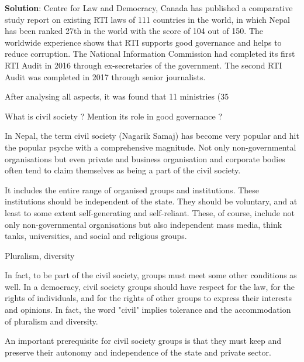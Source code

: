 \documentclass[
]{book}
\newcommand{\question}{\item}
\newenvironment{solution}{ {\bfseries Solution}:}{}
\begin{document}
\begin{questions}
\begin{solution}
Centre for Law and Democracy, Canada has published a comparative study report on existing RTI laws of 111 countries in the world, in which Nepal has been ranked 27th in the world with the score of 104 out of 150. The worldwide experience shows that RTI supports good governance and helps to reduce corruption. The National Information Commission had completed its first RTI Audit in 2016 through ex-secretaries of the government. The second RTI Audit was completed in 2017 through senior journalists.

After analysing all aspects, it was found that 11 ministries (35%

\end{solution}

\question What is civil society ? Mention its role in good governance ?

In Nepal, the term civil society (Nagarik Samaj) has become very popular and hit the popular psyche with a comprehensive magnitude. Not only non-governmental organisations but even private and business organisation and corporate bodies often tend to claim themselves as being a part of the civil society.

It includes the entire range of organised groups and institutions. These institutions should be independent of the state. They should be voluntary, and at least to some extent self-generating and self-reliant. These, of course, include not only non-governmental organisations but also independent mass media, think tanks, universities, and social and religious groups.

Pluralism, diversity

In fact, to be part of the civil society, groups must meet some other conditions as well. In a democracy, civil society groups should have respect for the law, for the rights of individuals, and for the rights of other groups to express their interests and opinions.  In fact, the word "civil" implies tolerance and the accommodation of pluralism and diversity.

An important prerequisite for civil society groups is that they must keep and preserve their autonomy and independence of the state and private sector.


\end{questions}
\end{document}
